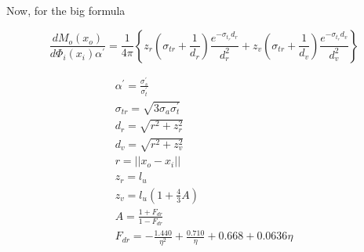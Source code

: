 \documentclass{article}
\begin{document}
Now, for the big formula

\begin{equation}
\frac{dM_o(x_o)}{d\Phi _i(x_i)\alpha ^{\prime}} = \frac{1}{4\pi}
\left\{ 
z_r ( {\sigma}_{tr} + \frac{1}{d_r} ) \frac{e^{-{\sigma} _{t_r} d_r}}{d _r ^2} + 
z_v ( {\sigma}_{tr} + \frac{1}{d_v} ) \frac{e^{-{\sigma} _{t_r} d_v}}{d _v ^2}
\right\}
\end{equation}

\begin{align}
\alpha ^{\prime} = \frac{{\sigma} _s ^{\prime}} {{\sigma} _t ^{\prime}} \\
{\sigma}_{tr} = \sqrt{3 {\sigma}_a {\sigma} _t ^{\prime}} \\
d_r = \sqrt{r^2 + z_r^2} \\
d_v = \sqrt{r^2 + z_v^2} \\
r = ||x_o - x_i|| \\
z_r = l_u \\
z_v = l_u ( 1 + \frac{4}{3}A ) \\
A = \frac{1 + F_{dr}}{1 - F_{dr}} \\
F_{dr} = -\frac{1.440}{\eta^2} + \frac{0.710}{\eta} + 0.668 + 0.0636\eta
\end{align}
\end{document}
